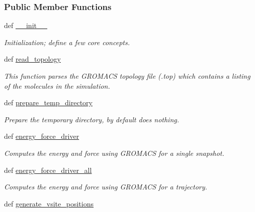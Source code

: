 \subsubsection*{\-Public \-Member \-Functions}
\begin{DoxyCompactItemize}
\item 
def \hyperlink{classforcebalance_1_1gmxio_1_1AbInitio__GMX_a1d03ae8104bcecacf96884058f2698af}{\-\_\-\-\_\-init\-\_\-\-\_\-}
\begin{DoxyCompactList}\small\item\em \-Initialization; define a few core concepts. \end{DoxyCompactList}\item 
def \hyperlink{classforcebalance_1_1gmxio_1_1AbInitio__GMX_aba138ca4195a1737f2f00bd8c5f3ca07}{read\-\_\-topology}
\begin{DoxyCompactList}\small\item\em \-This function parses the \-G\-R\-O\-M\-A\-C\-S topology file (.top) which contains a listing of the molecules in the simulation. \end{DoxyCompactList}\item 
def \hyperlink{classforcebalance_1_1gmxio_1_1AbInitio__GMX_ab2eac76585bdb8401812f0c8e465a44e}{prepare\-\_\-temp\-\_\-directory}
\begin{DoxyCompactList}\small\item\em \-Prepare the temporary directory, by default does nothing. \end{DoxyCompactList}\item 
def \hyperlink{classforcebalance_1_1gmxio_1_1AbInitio__GMX_a4bc31d1c02d47749d26b14779f025ebd}{energy\-\_\-force\-\_\-driver}
\begin{DoxyCompactList}\small\item\em \-Computes the energy and force using \-G\-R\-O\-M\-A\-C\-S for a single snapshot. \end{DoxyCompactList}\item 
def \hyperlink{classforcebalance_1_1gmxio_1_1AbInitio__GMX_a6e43c323b2286c546ff8afd3377f8808}{energy\-\_\-force\-\_\-driver\-\_\-all}
\begin{DoxyCompactList}\small\item\em \-Computes the energy and force using \-G\-R\-O\-M\-A\-C\-S for a trajectory. \end{DoxyCompactList}\item 
def \hyperlink{classforcebalance_1_1gmxio_1_1AbInitio__GMX_ae17e3c379d82935d725dd31f01df23e5}{generate\-\_\-vsite\-\_\-positions}

\end{DoxyCompactItemize}
